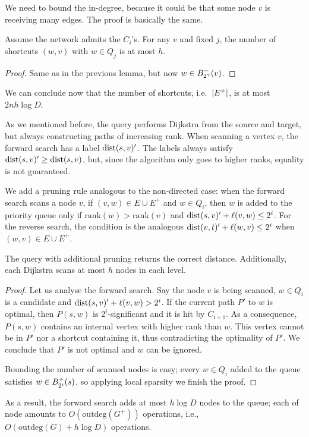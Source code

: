 We need to bound the in-degree, because it could be that some node $v$ is receiving many edges.
The proof is basically the same.
\begin{lemma}
	Assume the network admits the $C_i$'s.
	For any $v$ and fixed $j$, the number of shortcuts $(w,v)$ with $w\in Q_j$ is at most $h$.
\end{lemma}
\begin{proof}
	Same as in the previous lemma, but now $w\in B^-_{2^\gamma}(v)$.
\end{proof}

We can conclude now that the number of shortcuts, i.e.\ $\lvert E^+\rvert$, is at most $2nh\log D$.

As we mentioned before, the query performs Dijkstra from the source and target, but always constructing paths of increasing rank.
When scanning a vertex $v$, the forward search has a label $\mbox{dist}(s,v)'$. 
The labels always satisfy $\mbox{dist}(s,v)'\geq\mbox{dist}(s,v)$, but, since the algorithm only goes to higher ranks, equality is not guaranteed.

We add a pruning rule analogous to the non-directed case: when the forward search scans a node $v$, if $(v,w)\in E\cup E^+$ and $w\in Q_i$, then $w$ is added to the priority queue only if $\text{rank}(w)>\text{rank}(v)$ and $\mbox{dist}(s,v)'+\ell(v,w)\leq 2^i$.
For the reverse search, the condition is the analogous $\mbox{dist}(v,t)'+\ell(w,v)\leq 2^i$ when $(w,v)\in  E\cup E^+$.

\begin{proposition}
	The query with additional pruning returns the correct distance.
	Additionally, each Dijkstra scans at most $h$ nodes in each level.
\end{proposition}
\begin{proof}
	Let us analyse the forward search.
	Say the node $v$ is being scanned, $w\in Q_i$ is a candidate and $\mbox{dist}(s,v)'+\ell(v,w)>2^i$.
	If the current path $P'$ to $w$ is optimal, then $P(s,w)$ is $2^i$-significant and it is hit by $C_{i+1}$. 
	As a consequence, $P(s,w)$ contains an internal vertex with higher rank than $w$.
	This vertex cannot be in $P'$ nor a shortcut containing it, thus contradicting the optimality of $P'$.
	We conclude that $P'$ is not optimal and $w$ can be ignored.
	
	Bounding the number of scanned nodes is easy; every $w\in Q_i$ added to the queue satisfies $w\in B^+_{2^i}(s)$, so applying local sparsity we finish the proof.
\end{proof}

As a result, the forward search adds at most $h\log D$ nodes to the queue;
each of node amounts to $O(\text{outdeg} (G^+))$ operations, i.e., $O(\text{outdeg}(G) + h\log D)$ operations.
